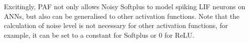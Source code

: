 \documentclass{article}
\begin{document}
Excitingly, PAF not only allows Noisy Softplus to model spiking LIF neurons on ANNs, but also can be generalised to other activation functions.
Note that the calculation of noise level is not necessary for other activation functions, for example, it can be set to a constant for Softplus or 0 for ReLU.
%
%
%
%
%
\end{document}
